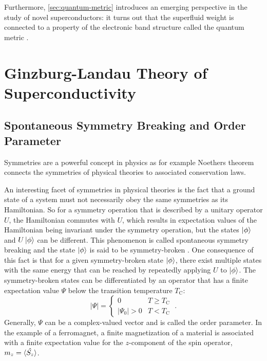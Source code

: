\documentclass[../main.tex]{subfiles}
\begin{document}
Furthermore, \cref{sec:quantum-metric} introduces an emerging perspective in the study of novel superconductors: it turns out that the superfluid weight is connected to a property of the electronic band structure called the quantum metric \cite{peottaSuperfluidityTopologicallyNontrivial2015, yuQuantumGeometryQuantum2024}. 

\section{Ginzburg-Landau Theory of Superconductivity}\label{sec:Ginzburg-Landau theory of superconductivity}

\subsection*{Spontaneous Symmetry Breaking and Order Parameter}

Symmetries are a powerful concept in physics as for example Noethers theorem \cite{noetherInvarianteVariationsprobleme1918} connects the symmetries of physical theories to associated conservation laws.

An interesting facet of symmetries in physical theories is the fact that a ground state of a system must not necessarily obey the same symmetries as its Hamiltonian.
So for a symmetry operation that is described by a unitary operator \(U\), the Hamiltonian commutes with \(U\), which results in expectation values of the Hamiltonian being invariant under the symmetry operation, but the states \(\ket{\phi}\) and \(U \ket{\phi}\) can be different.
This phenomenon is called spontaneous symmetry breaking and the state \(\ket{\phi}\) is said to be symmetry-broken \cite{beekmanIntroductionSpontaneousSymmetry2019}.
One consequence of this fact is that for a given symmetry-broken state \(\ket{\phi}\), there exist multiple states with the same energy that can be reached by repeatedly applying \(U\) to \(\ket{\phi}\).
The symmetry-broken states can be differentiated by an operator that has a finite expectation value \(\Psi\) below the transition temperature \(T_{\mathrm{C}}\):
\begin{equation}
	\vert \Psi \vert =
	\begin{cases}
		0 & T \geq T_{\mathrm{C}} \\
		\vert \Psi_0 \vert > 0 & T < T_{\mathrm{C}}
	\end{cases} \;.
\end{equation}
Generally, \(\Psi\) can be a complex-valued vector and is called the order parameter.
In the example of a ferromagnet, a finite magnetization of a material is associated with a finite expectation value for the \(z\)-component of the spin operator, \(m_z = \braket{\hat{S_z}}\).
\end{document}
